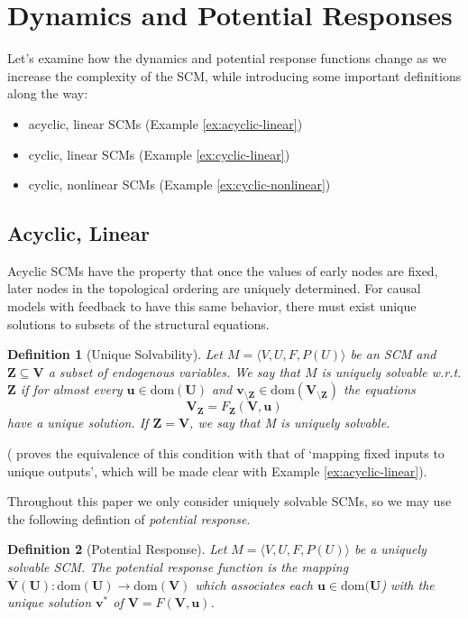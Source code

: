 \documentclass[letterpaper,10pt]{article}
\newtheorem{definition}{Definition}
\begin{document}
\section{Dynamics and Potential Responses}\label{intuition}

Let’s examine how the dynamics and potential response functions change as we increase the complexity of the SCM, while introducing some important definitions along the way:
\begin{itemize}
  \item acyclic, linear SCMs (Example \ref{ex:acyclic-linear})
  \item cyclic, linear SCMs (Example \ref{ex:cyclic-linear})
  \item cyclic, nonlinear SCMs (Example \ref{ex:cyclic-nonlinear})
\end{itemize}

\subsection{Acyclic, Linear}

Acyclic SCMs have the property that once the values of early nodes are fixed, later nodes in the topological ordering are uniquely determined. For causal models with feedback to have this same behavior, there must exist unique solutions to subsets of the structural equations.

\begin{definition}[Unique Solvability]
Let $M=\langle V,U,F,P(U)\rangle$ be an SCM and $\mathbf{Z}\subseteq\mathbf{V}$ a subset of endogenous variables. We say that $M$ is uniquely solvable w.r.t. $\mathbf{Z}$ if for almost every $\mathbf{u}\in\text{dom}(\mathbf{U})$ and $\mathbf{v}_{\setminus\mathbf{Z}}\in\text{dom}(\mathbf{V}_{\setminus\mathbf{Z}})$ the equations
\[
\mathbf{V}_{\mathbf{Z}} = F_{\mathbf{Z}}(\mathbf{V},\mathbf{u})
\]
have a unique solution. If $\mathbf{Z}=\mathbf{V}$, we say that M is uniquely solvable.
\end{definition}

(\cite{Foundations} proves the equivalence of this condition with that of `mapping fixed inputs to unique outputs', which will be made clear with Example \ref{ex:acyclic-linear}).

Throughout this paper we only consider uniquely solvable SCMs, so we may use the following defintion of \emph{potential response}.

\begin{definition}[Potential Response]\label{defn:potential-response}
Let $M=\langle V,U,F,P(U)\rangle$ be a uniquely solvable SCM. 
The potential response function is the mapping $\overline{\mathbf{V}}(\mathbf{U}):\text{dom}(\mathbf{U})\to\text{dom}(\mathbf{V})$ which associates each $\mathbf{u}\in\text{dom}(\mathbf{U}$) with the unique solution $\mathbf{v}^*$ of $\mathbf{V} = F(\mathbf{V},\mathbf{u})$.
\end{definition}
\end{document}
